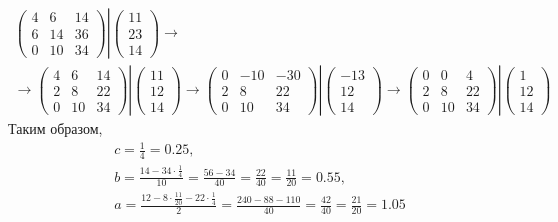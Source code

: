 \documentclass[12pt]{article}
\begin{document}
\begin{gather*}
        \begin{pmatrix}
            4 & 6  & 14 \\
            6 & 14 & 36 \\
            0 & 10 & 34
        \end{pmatrix}
        \left |
        \begin{pmatrix}
            11 \\
            23 \\
            14
        \end{pmatrix}
        \right .
        \rightarrow \\
        \rightarrow
        \begin{pmatrix}
            4 & 6  & 14 \\
            2 & 8  & 22 \\
            0 & 10 & 34
        \end{pmatrix}
        \left |
        \begin{pmatrix}
            11 \\
            12 \\
            14
        \end{pmatrix}
        \right .
        \rightarrow
        \begin{pmatrix}
            0 & -10 & -30 \\
            2 & 8   & 22  \\
            0 & 10  & 34
        \end{pmatrix}
        \left |
        \begin{pmatrix}
            -13 \\
            12  \\
            14
        \end{pmatrix}
        \right .
        \rightarrow
        \begin{pmatrix}
            0 & 0  & 4  \\
            2 & 8  & 22 \\
            0 & 10 & 34
        \end{pmatrix}
        \left |
        \begin{pmatrix}
            1  \\
            12 \\
            14
        \end{pmatrix}
        \right .
    \end{gather*}
    Таким образом,
    \begin{gather*}
        c
        = \frac{1}{4}
        = 0.25, \\
        b
        = \frac{14 - 34 \cdot \frac{1}{4}}{10}
        = \frac{56 - 34}{40}
        = \frac{22}{40}
        = \frac{11}{20}
        = 0.55, \\
        a
        = \frac{12 - 8 \cdot \frac{11}{20} - 22 \cdot \frac{1}{4}}{2}
        = \frac{240 - 88 - 110}{40}
        = \frac{42}{40}
        = \frac{21}{20}
        = 1.05
    \end{gather*}
\end{document}
